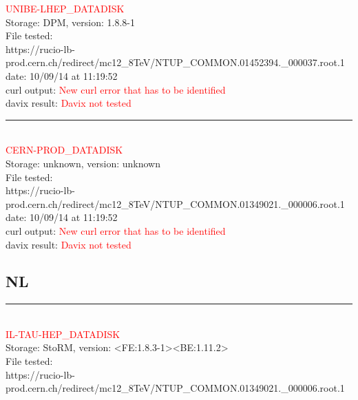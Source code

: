 \textcolor{red}{\normalsize{UNIBE-LHEP\_DATADISK}}\\

Storage: DPM, version: 1.8.8-1\\

File tested:\\
\footnotesize{https://rucio-lb-prod.cern.ch/redirect/mc12\_8TeV/NTUP\_COMMON.01452394.\_000037.root.1}\\

date: 10/09/14 at 11:19:52\\

curl output:  \textcolor{red}{New curl error that has to be identified}\\

davix result:  \textcolor{red}{Davix not tested}\\

\rule{\textwidth}{1pt}\\

\textcolor{red}{\normalsize{CERN-PROD\_DATADISK}}\\

Storage: unknown, version: unknown\\

File tested:\\
\footnotesize{https://rucio-lb-prod.cern.ch/redirect/mc12\_8TeV/NTUP\_COMMON.01349021.\_000006.root.1}\\

date: 10/09/14 at 11:19:52\\

curl output:  \textcolor{red}{New curl error that has to be identified}\\

davix result:  \textcolor{red}{Davix not tested}\\

\subsection{NL}

\rule{\textwidth}{1pt}\\

\textcolor{red}{\normalsize{IL-TAU-HEP\_DATADISK}}\\

Storage: StoRM, version: <FE:1.8.3-1><BE:1.11.2>\\

File tested:\\
\footnotesize{https://rucio-lb-prod.cern.ch/redirect/mc12\_8TeV/NTUP\_COMMON.01349021.\_000006.root.1}\\

